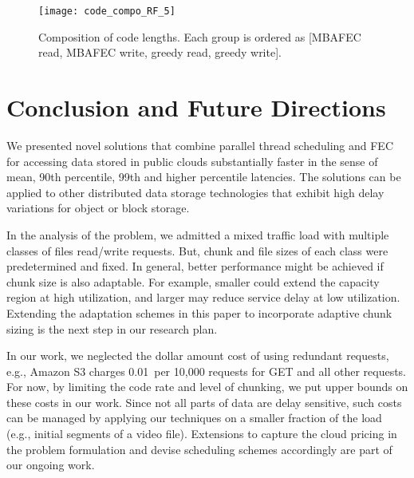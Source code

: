 \documentclass[journal]{IEEEtran}
\newcommand{\multiclass}{{MBAFEC}\xspace}
\begin{document}
\begin{figure}[t]
\centering
\texttt{[image: code\_compo\_RF\_5]}
\vspace{-10pt}
\caption{Composition of code lengths. Each group is ordered as [\multiclass read, \multiclass write, greedy read, greedy write].}
\label{fig:code_compo}
\vspace{-15pt}
\end{figure}



\section{Conclusion and Future Directions}
\label{sec:conclusion}
We presented novel solutions that combine parallel thread scheduling and FEC for accessing data stored in public clouds substantially faster in the sense of mean, 90th percentile, 99th and higher percentile latencies. The solutions can be applied to other distributed data storage technologies that exhibit high delay variations for object or block storage. 

In the analysis of the problem, we admitted a mixed traffic load with multiple classes of files read/write requests. But, chunk and file sizes of each class were predetermined and fixed. 
In general, better performance might be achieved if chunk size is also adaptable. For example, smaller  could extend the capacity region at high utilization, and larger  may reduce service delay at low utilization. Extending the adaptation schemes in this paper to incorporate adaptive chunk sizing is the next step in our research plan.


In our work, we neglected the dollar amount cost of using redundant requests, e.g., Amazon S3 charges 0.01\ per 10,000 requests for GET and all other requests. For now, by limiting the code rate and level of chunking, we put upper bounds on these costs in our work. Since not all parts of data are delay sensitive, such costs can be managed by applying our techniques on a smaller fraction of the load (e.g., initial segments of a video file). Extensions to capture the cloud pricing in the problem formulation and devise scheduling schemes accordingly are part of our ongoing work.




\end{document}

